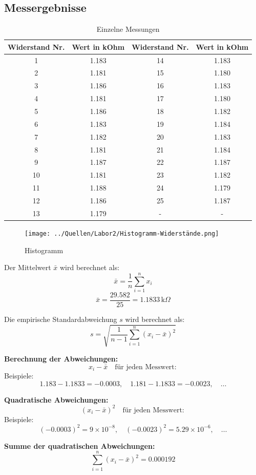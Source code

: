 \documentclass[a4paper,12pt]{article}
\begin{document}
\subsection{Messergebnisse}
\begin{table}[H]
	\centering
	\begin{tabular}{|c|c|c|c|}
		\hline
		Widerstand Nr. & Wert in kOhm & Widerstand Nr. & Wert in kOhm \\
		\hline
		1 & 1.183 & 14 & 1.183 \\
		2 & 1.181 & 15 & 1.180 \\
		3 & 1.186 & 16 & 1.183 \\
		4 & 1.181 & 17 & 1.180 \\
		5 & 1.186 & 18 & 1.182 \\
		6 & 1.183 & 19 & 1.184 \\
		7 & 1.182 & 20 & 1.183 \\
		8 & 1.181 & 21 & 1.184 \\
		9 & 1.187 & 22 & 1.187 \\
		10 & 1.181 & 23 & 1.182 \\
		11 & 1.188 & 24 & 1.179 \\
		12 & 1.186 & 25 & 1.187 \\
		13 & 1.179 & - & - \\
		\hline
	\end{tabular}
	\caption{Einzelne Messungen}
\end{table}

\begin{figure}[H]
    \centering
    \texttt{[image: ../Quellen/Labor2/Histogramm-Widerstände.png]}
\caption{Histogramm}
\end{figure}

Der Mittelwert \( \bar{x} \) wird berechnet als:
\[
\bar{x} = \frac{1}{n} \sum_{i=1}^{n} x_i
\]
\[
\bar{x} = \frac{29.582}{25} = 1.1833 \, \text{k}\Omega
\]

Die empirische Standardabweichung \( s \) wird berechnet als:
\[
s = \sqrt{\frac{1}{n-1} \sum_{i=1}^{n} (x_i - \bar{x})^2}
\]

\textbf{Berechnung der Abweichungen:}
\[
x_i - \bar{x} \quad \text{für jeden Messwert}:
\]
Beispiele: 
\[
1.183 - 1.1833 = -0.0003, \quad 1.181 - 1.1833 = -0.0023, \quad \dots
\]

\textbf{Quadratische Abweichungen:}
\[
(x_i - \bar{x})^2 \quad \text{für jeden Messwert}:
\]
Beispiele:
\[
(-0.0003)^2 = 9 \times 10^{-8}, \quad (-0.0023)^2 = 5.29 \times 10^{-6}, \quad \dots
\]

\textbf{Summe der quadratischen Abweichungen:}
\[
\sum_{i=1}^{n} (x_i - \bar{x})^2 = 0.000192
\]
\end{document}
